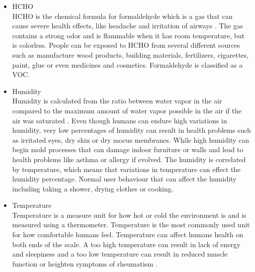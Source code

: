 \begin{itemize}
     \item HCHO\\
        HCHO is the chemical formula for formaldehyde which is a gas that can cause severe health effects, like headache and irritation of airways \cite{HCHO}. The gas contains a strong odor and is flammable when it has room temperature, but is colorless. People can be exposed to HCHO from several different sources such as manufacture wood products, building materials, fertilizers, cigarettes, paint, glue or even medicines and cosmetics. Formaldehyde is classified as a VOC.\\
    \item Humidity\\
        Humidity is calculated from the ratio between water vapor in the air compared to the maximum amount of water vapor possible in the air if the air was saturated \cite{RecommendedIAQ}. Even though humans can endure high variations in humidity, very low percentages of humidity can result in health problems such as irritated eyes, dry skin or dry mocus membranes. While high humidity can begin mold processes that can damage indoor furniture or walls and lead to health problems like asthma or allergy if evolved. The humidity is correlated by temperature, which means that variations in temperature can effect the humidity percentage. Normal user behaviour that can affect the humidity including taking a shower, drying clothes or cooking. \\
    \item Temperature\\
        Temperature is a measure unit for how hot or cold the environment is and is measured using a thermometer. Temperature is the most commonly used unit for how comfortable humans feel. Temperature can affect humans health on both ends of the scale. A too high temperature can result in lack of energy and sleepiness and a too low temperature can result in reduced muscle function or heighten symptoms of rheumatism \cite{Temp}.\\
\end{itemize}

